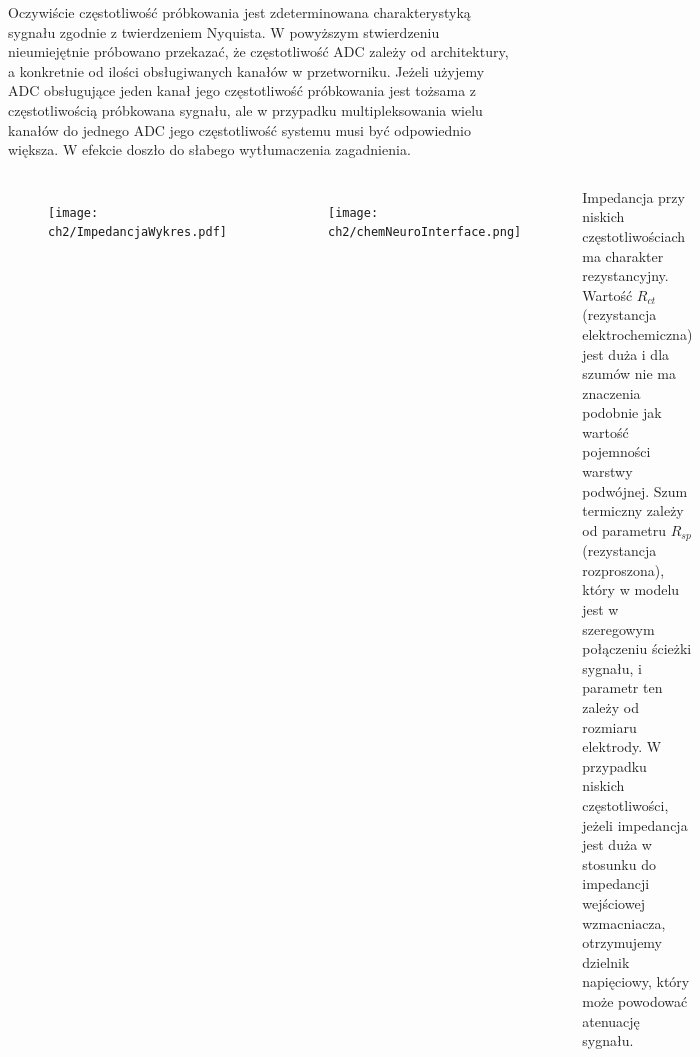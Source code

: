 \begin{frame}[t]
    \begin{block}{\dk}
    \end{block}
    Oczywiście częstotliwość próbkowania jest zdeterminowana charakterystyką sygnału zgodnie z twierdzeniem Nyquista.
    W powyższym stwierdzeniu nieumiejętnie próbowano przekazać, że częstotliwość ADC zależy od architektury, a konkretnie od ilości obsługiwanych kanałów w przetworniku.
    Jeżeli użyjemy ADC obsługujące jeden kanał jego częstotliwość próbkowania jest tożsama z częstotliwością próbkowana sygnału, ale w przypadku multipleksowania wielu kanałów do jednego ADC jego częstotliwość systemu musi być odpowiednio większa.
    W efekcie doszło do słabego wytłumaczenia zagadnienia.
 
\end{frame}

\begin{frame}[t]
    \begin{block}{\dk}
    \end{block}

    \begin{columns}

        \vspace{-1em}
        \begin{figure}[H]
            \texttt{[image: ch2/ImpedancjaWykres.pdf]}
        \end{figure}
        \vspace{-1em}
        \begin{figure}[H]
            \texttt{[image: ch2/chemNeuroInterface.png]}
        \end{figure}
    
        Impedancja przy niskich częstotliwościach ma charakter rezystancyjny.
        Wartość $R_{ct}$ (rezystancja elektrochemiczna) jest duża i dla szumów nie ma znaczenia podobnie jak wartość pojemności warstwy podwójnej.  
        Szum termiczny zależy od parametru $R_{sp}$ (rezystancja rozproszona), który w modelu jest w szeregowym połączeniu ścieżki sygnału, i parametr ten zależy  od rozmiaru elektrody.
        W przypadku niskich częstotliwości, jeżeli impedancja jest duża w stosunku do impedancji wejściowej wzmacniacza, otrzymujemy dzielnik napięciowy, który może powodować atenuację sygnału. 
        
    \end{columns}
\end{frame}

